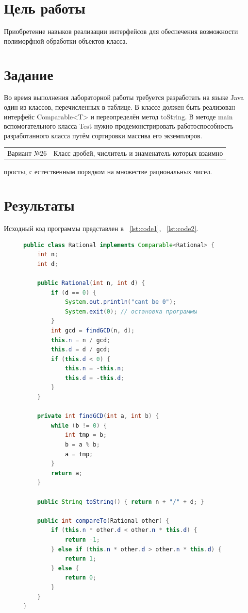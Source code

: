 \documentclass[a4paper, 14pt]{extarticle}
\begin{document}
\renewcommand{\ttdefault}{pcr}

\setlength{\tabcolsep}{3pt}
\newpage
\setcounter{page}{2}

\section{Цель работы}\label{Sect::point}
Приобретение навыков реализации интерфейсов для обеспечения возможности
полиморфной обработки объектов класса.


\section{Задание}\label{Sect::task}

Во время выполнения лабораторной работы требуется разработать на языке Java один из
классов, перечисленных в таблице. В классе должен быть реализован интерфейс Comparable<T>
и переопределён метод toString. В методе main вспомогательного класса Test нужно
продемонстрировать работоспособность разработанного класса путём сортировки массива его
экземпляров.

\begin{tabular}{ l | c }
Вариант №26 & Класс дробей, числитель и знаменатель которых взаимно
\end{tabular}
просты, с естественным порядком на множестве рациональных чисел.



\section{Результаты}\label{Sect::res}

Исходный код программы представлен в ~\ref{lst:code1}, ~\ref{lst:code2}.

\begin{figure}[!htb]
\begin{lstlisting}[language={java},caption={Файл Rational.java},label={lst:code1}]
public class Rational implements Comparable<Rational> {
    int n;
    int d;

    public Rational(int n, int d) {
        if (d == 0) {
            System.out.println("cant be 0");
            System.exit(0); // остановка программы
        }
        int gcd = findGCD(n, d);
        this.n = n / gcd;
        this.d = d / gcd;
        if (this.d < 0) {
            this.n = -this.n;
            this.d = -this.d;
        }
    }

    private int findGCD(int a, int b) {
        while (b != 0) {
            int tmp = b;
            b = a % b;
            a = tmp;
        }
        return a;
    }

    public String toString() { return n + "/" + d; }

    public int compareTo(Rational other) {
        if (this.n * other.d < other.n * this.d) {
            return -1;
        } else if (this.n * other.d > other.n * this.d) {
            return 1;
        } else {
            return 0;
        }
    }
}


\end{lstlisting}
\end{figure}
\end{document}

